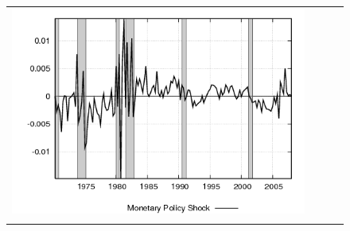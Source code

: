 \begin{figure}
\begin{tabular}{cccc}
\includegraphics[scale=0.22]{results_reallinit/mpshock.png} \\ \\ 
 

\end{tabular}
\end{figure}
